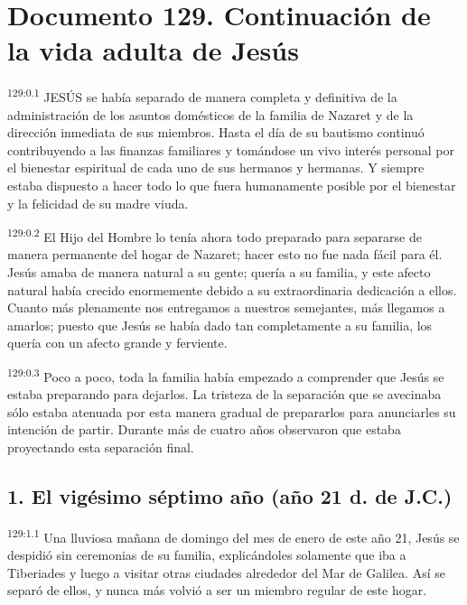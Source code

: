 \chapter{Documento 129. Continuación de la vida adulta de Jesús}
\par
\textsuperscript{129:0.1} JESÚS se había separado de manera completa y definitiva de la administración de los asuntos domésticos de la familia de Nazaret y de la dirección inmediata de sus miembros. Hasta el día de su bautismo continuó contribuyendo a las finanzas familiares y tomándose un vivo interés personal por el bienestar espiritual de cada uno de sus hermanos y hermanas. Y siempre estaba dispuesto a hacer todo lo que fuera humanamente posible por el bienestar y la felicidad de su madre viuda.

\par
\textsuperscript{129:0.2} El Hijo del Hombre lo tenía ahora todo preparado para separarse de manera permanente del hogar de Nazaret; hacer esto no fue nada fácil para él. Jesús amaba de manera natural a su gente; quería a su familia, y este afecto natural había crecido enormemente debido a su extraordinaria dedicación a ellos. Cuanto más plenamente nos entregamos a nuestros semejantes, más llegamos a amarlos; puesto que Jesús se había dado tan completamente a su familia, los quería con un afecto grande y ferviente.

\par
\textsuperscript{129:0.3} Poco a poco, toda la familia había empezado a comprender que Jesús se estaba preparando para dejarlos. La tristeza de la separación que se avecinaba sólo estaba atenuada por esta manera gradual de prepararlos para anunciarles su intención de partir. Durante más de cuatro años observaron que estaba proyectando esta separación final.

\section*{1. El vigésimo séptimo año (año 21 d. de J.C.)}
\par
\textsuperscript{129:1.1} Una lluviosa mañana de domingo del mes de enero de este año 21, Jesús se despidió sin ceremonias de su familia, explicándoles solamente que iba a Tiberiades y luego a visitar otras ciudades alrededor del Mar de Galilea. Así se separó de ellos, y nunca más volvió a ser un miembro regular de este hogar.


